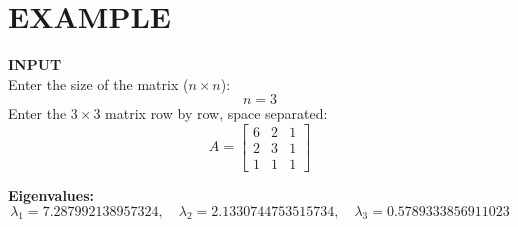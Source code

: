 \documentclass[journal]{IEEEtran}
\begin{document}
\section{\textbf{EXAMPLE}}
\textbf{INPUT}\\
Enter the size of the matrix (\(n \times n\)): 
\[
n = 3
\]
Enter the \(3 \times 3\) matrix row by row, space separated:
\[
A = \begin{bmatrix}
6 & 2 & 1 \\
2 & 3 & 1 \\
1 & 1 & 1
\end{bmatrix}
\]

\textbf{Eigenvalues:}
\[
\lambda_1 = 7.287992138957324, \quad \lambda_2 = 2.1330744753515734, \quad \lambda_3 = 0.5789333856911023
\]
\end{document}
